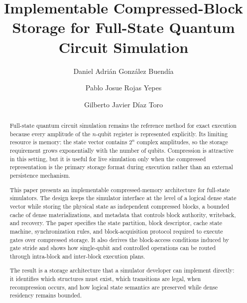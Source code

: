 \documentclass[runningheads]{llncs}
\begin{document}
\title{Implementable Compressed-Block Storage for Full-State Quantum Circuit Simulation}

\author{Daniel Adri{\'a}n Gonz{\'a}lez Buend{\'i}a \and
Pablo Josue Rojas Yepes \and
Gilberto Javier D{\'i}az Toro}


\maketitle

\begin{abstract}
Full-state quantum circuit simulation remains the reference method for exact execution because every amplitude of the $n$-qubit register is represented explicitly. Its limiting resource is memory: the state vector contains $2^n$ complex amplitudes, so the storage requirement grows exponentially with the number of qubits. Compression is attractive in this setting, but it is useful for live simulation only when the compressed representation is the primary storage format during execution rather than an external persistence mechanism.

This paper presents an implementable compressed-memory architecture for full-state simulators. The design keeps the simulator interface at the level of a logical dense state vector while storing the physical state as independent compressed blocks, a bounded cache of dense materializations, and metadata that controls block authority, writeback, and recovery. The paper specifies the state partition, block descriptor, cache state machine, synchronization rules, and block-acquisition protocol required to execute gates over compressed storage. It also derives the block-access conditions induced by gate stride and shows how single-qubit and controlled operations can be routed through intra-block and inter-block execution plans.

The result is a storage architecture that a simulator developer can implement directly: it identifies which structures must exist, which transitions are legal, when recompression occurs, and how logical state semantics are preserved while dense residency remains bounded.

\end{abstract}
\end{document}
